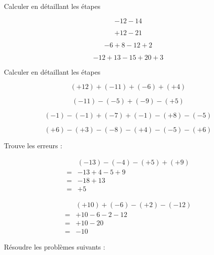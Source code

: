  Calculer en détaillant les étapes

\begin{multicols}{2}
    $$-12-14$$
    \vspace*{3em}

    $$+12-21$$
    \vspace*{7em}\columnbreak

    $$-6+8-12+2$$
    \vspace*{3em}

    $$-12+13-15+20+3$$
    \vspace*{7em}
\end{multicols}

\vspace*{-1em}

 Calculer en détaillant les étapes

\begin{multicols}{2}
    $$(+12)+(-11)+(-6)+(+4)$$
    \vspace*{8em}

    $$(-11)-(-5)+(-9)-(+5)$$
    \vspace*{8em}\columnbreak

    $$(-1)-(-1)+(-7)+(-1)-(+8)-(-5)$$
    \vspace*{8em}

    $$(+6)-(+3)-(-8)-(+4)-(-5)-(+6)$$
    \vspace*{8em}
\end{multicols}

\newpage



 Trouve les erreurs :

\begin{multicols}{2}
    \noindent\begin{align*}
        &(-13)-(-4)-(+5)+(+9)\\
        =&-13+4-5+9\\
        =&-18+13\\
        =&+5
    \end{align*} 

    \noindent\begin{align*}
        &(+10)+(-6)-(+2)-(-12)\\
        =&+10-6-2-12\\
        =&+10-20\\
        =&-10
    \end{align*}
\end{multicols}

 Résoudre les problèmes suivants :

